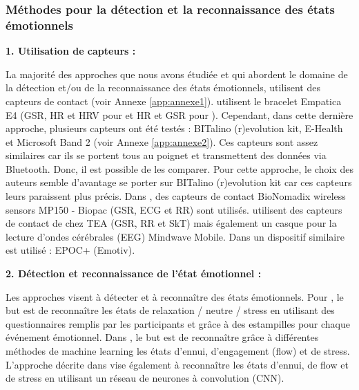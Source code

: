 \documentclass[11pt]{article}
\begin{document}
		\subsubsection{Méthodes pour la détection et la reconnaissance des états émotionnels}\label{sec:etatemotionnel}
			\textbf{1. Utilisation de capteurs :}\par
            La majorité des approches que nous avons étudiée et qui abordent le domaine de la détection et/ou de la reconnaissance des états émotionnels, utilisent des capteurs de contact (voir Annexe \ref{app:annexe1}). 
            \cite{maier_et_al._2019,nalepa_et_al._2017,gizycka_et_al._2018} utilisent le bracelet Empatica E4 (GSR, HR et HRV pour \cite{maier_et_al._2019} et HR et GSR pour \cite{nalepa_et_al._2017,gizycka_et_al._2018}). 
            Cependant, dans cette dernière approche, plusieurs capteurs ont été testés : BITalino (r)evolution kit, E-Health et Microsoft Band 2 (voir Annexe \ref{app:annexe2}). 
            Ces capteurs sont assez similaires car ils se portent tous au poignet et transmettent des données via Bluetooth. 
            Donc, il est possible de les comparer.
            Pour cette approche, le choix des auteurs semble d'avantage se porter sur BITalino (r)evolution kit car ces capteurs leurs paraissent plus précis. 
            Dans \cite{yang_et_al._2018}, des capteurs de contact BioNomadix wireless sensors MP150 - Biopac (GSR, ECG et RR) sont utilisés. 
            \cite{gal_2019,gal_et_al._2020} utilisent des capteurs de contact de chez TEA (GSR, RR et SkT) mais également un casque pour la lecture d'ondes cérébrales (EEG) Mindwave Mobile. 
            Dans \cite{carofiglio_et_al._2019} un dispositif similaire est utilisé : EPOC+ (Emotiv).\par 
            \vspace*{0.6cm}
        	\textbf{2. Détection et reconnaissance de l'état émotionnel :}\par
            Les approches visent à détecter et à reconnaître des états émotionnels. Pour \cite{nalepa_et_al._2017,gizycka_et_al._2018}, le but est de reconnaître les états de relaxation / neutre / stress en utilisant des questionnaires remplis par les participants et grâce à des estampilles pour chaque événement émotionnel. 
            Dans \cite{carofiglio_et_al._2019}, le but est de reconnaître grâce à différentes méthodes de machine learning les états d'ennui, d'engagement (flow) et de stress. 
            L'approche décrite dans \cite{maier_et_al._2019} vise également à reconnaître les états d'ennui, de flow et de stress en utilisant un réseau de neurones à convolution (CNN). 
\end{document}
